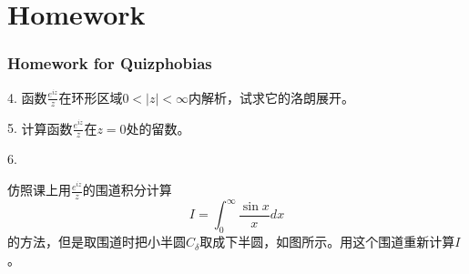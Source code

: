 \documentclass[CJK,13pt]{beamer}
\begin{document}
\section{Homework}
\begin{frame}
  \frametitle{Homework for Quizphobias}
  
  \bitem
\item[4.]{函数$\frac{e^{iz}}{z}$在环形区域$0<|z|<\infty$内解析，试求它的洛朗展开。}
\item[5.]{计算函数$\frac{e^{iz}}{z}$在$z=0$处的留数。}
\item[6.]{仿照课上用$\frac{e^{iz}}{z}$的围道积分计算
  $$I=\int_0^{\infty}\frac{\sin x}{x}dx$$
  的方法，但是取围道时把小半圆$C_\delta$取成下半圆，如图所示。用这个围道重新计算$I$。
  
}
  \eitem
    
\end{frame}

\ech
\end{document}
